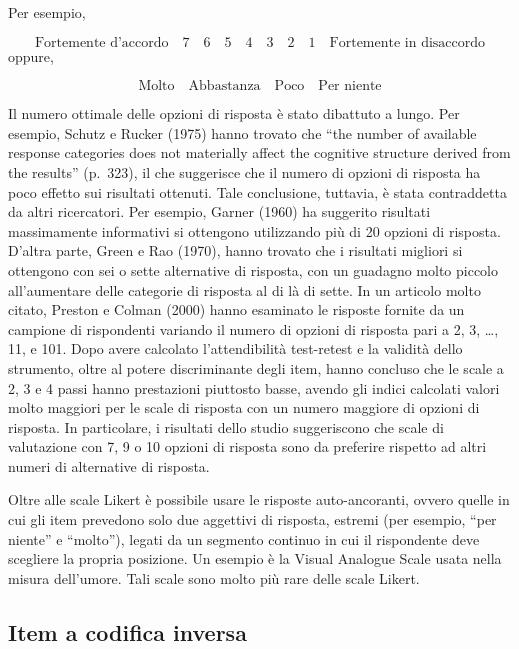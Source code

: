 \documentclass[
  11pt,
]{krantz}
\theoremstyle{definition}
\theoremstyle{definition}
\theoremstyle{definition}
\theoremstyle{definition}
\theoremstyle{remark}
\begin{document}
Per esempio,

\[\text{Fortemente d'accordo} \quad 7\quad 6 \quad 5 \quad 4 \quad 3 \quad 2 \quad 1 \quad \text{Fortemente in disaccordo}\] oppure,

\[\text{Molto} \quad \text{Abbastanza}\quad \text{Poco} \quad \text{Per niente}\]

Il numero ottimale delle opzioni di risposta è stato dibattuto a lungo. Per esempio, Schutz e Rucker (1975) hanno trovato che ``the number of available response categories does not materially affect the cognitive structure derived from the results'' (p.~323), il che suggerisce che il numero di opzioni di risposta ha poco effetto sui risultati ottenuti. Tale conclusione, tuttavia, è stata contraddetta da altri ricercatori. Per esempio, Garner (1960) ha suggerito risultati massimamente informativi si ottengono utilizzando più di 20 opzioni di risposta. D'altra parte, Green e Rao (1970), hanno trovato che i risultati migliori si ottengono con sei o sette alternative di risposta, con un guadagno molto piccolo all'aumentare delle categorie di risposta al di là di sette. In un articolo molto citato, Preston e Colman (2000) hanno esaminato le risposte fornite da un campione di rispondenti variando il numero di opzioni di risposta pari a 2, 3, \ldots, 11, e 101. Dopo avere calcolato l'attendibilità test-retest e la validità dello strumento, oltre al potere discriminante degli item, hanno concluso che le scale a 2, 3 e 4 passi hanno prestazioni piuttosto basse, avendo gli indici calcolati valori molto maggiori per le scale di risposta con un numero maggiore di opzioni di risposta. In particolare, i risultati dello studio suggeriscono che scale di valutazione con 7, 9 o 10 opzioni di risposta sono da preferire rispetto ad altri numeri di alternative di risposta.

Oltre alle scale Likert è possibile usare le risposte auto-ancoranti, ovvero quelle in cui gli item prevedono solo due aggettivi di risposta, estremi (per esempio, ``per niente'' e ``molto''), legati da un segmento continuo in cui il rispondente deve scegliere la propria posizione. Un esempio è la Visual Analogue Scale usata nella misura dell'umore. Tali scale sono molto più rare delle scale Likert.

\hypertarget{item-a-codifica-inversa}{%
\subsection{Item a codifica inversa}\label{item-a-codifica-inversa}}
\end{document}

